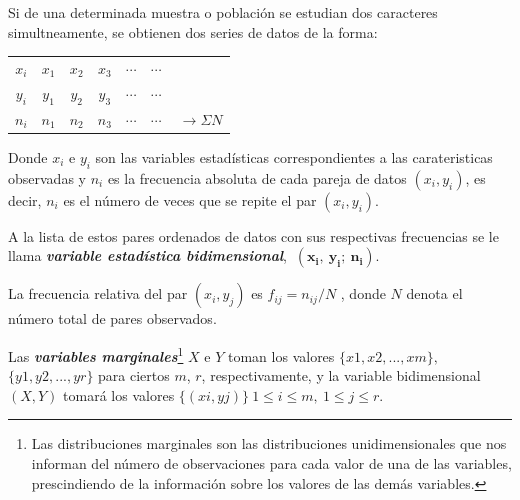 \begin{definition}


	

\begin{multicols}{2}
 
Si de una determinada muestra o población se estudian dos caracteres simultneamente, se obtienen dos series de datos de la forma:
 
\begin{table}[H]
\centering
\begin{tabular}{c|cccccc}
\textbf{$x_i$} & $x_1$ & $x_2$ & $x_3$ & $\cdots$ & $\cdots$ &  \\ \cline{1-6}
\textbf{$y_i$} & $y_1$ & $y_2$ & $y_3$ & $\cdots$ & $\cdots$ &  \\ \cline{1-6}
\textbf{$n_i$} & $n_1$ & $n_2$ & $n_3$ & $\cdots$ & $\cdots$ & $\ \to \Sigma N$
\end{tabular}
\end{table}
 
\end{multicols} 


 
Donde $x_i$ e $y_i$ son las variables estadísticas correspondientes a las carateristicas observadas y $n_i$ es la frecuencia absoluta de cada pareja de datos $(x_i,y_i)$, es decir, $n_i$ es el número de veces que se repite el par $(x_i,y_i)$.
 
\vspace{2mm}  A la lista de estos pares ordenados de datos con sus respectivas frecuencias se le llama \textbf{\emph{variable estadística bidimensional}}, $\ \boldsymbol{ (x_i, \ y_i; \ n_i)}$.

\vspace{2mm} La frecuencia relativa del par $(x_i,y_j)$ es $f_{i j} = n_{i j}/N$ , donde $N$ denota el número total de pares observados.

\vspace{2mm} Las \textbf{\emph{variables marginales}}\footnote{Las distribuciones marginales son las distribuciones unidimensionales que nos informan del número de observaciones para cada valor de una de las variables, prescindiendo de la información sobre los valores de las demás variables.} $X$ e $Y$ toman los valores $\{x1,x2,...,xm\},$  $\{y1,y2,...,yr\}$ para ciertos $m$, $r$, respectivamente, y la variable bidimensional $(X,Y)$ tomará los valores $\{(xi,yj)\}\ 1\le i \le m,\ 1 \le j \le r$.
 
\end{definition}
 

